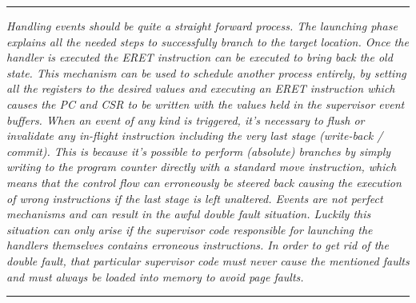     \par\noindent\rule{\textwidth}{0.4pt}
    \textit{Handling events should be quite a straight forward process. The launching phase explains all the needed steps to successfully branch to the target location. Once the handler is executed the ERET instruction can be executed to bring back the old state. This mechanism can be used to schedule another process entirely, by setting all the registers to the desired values and executing an ERET instruction which causes the PC and CSR to be written with the values held in the supervisor event buffers. When an event of any kind is triggered, it's necessary to flush or invalidate any in-flight instruction including the very last stage (write-back / commit). This is because it's possible to perform (absolute) branches by simply writing to the program counter directly with a standard move instruction, which means that the control flow can erroneously be steered back causing the execution of wrong instructions if the last stage is left unaltered. Events are not perfect mechanisms and can result in the awful double fault situation. Luckily this situation can only arise if the supervisor code responsible for launching the handlers themselves contains erroneous instructions. In order to get rid of the double fault, that particular supervisor code must never cause the mentioned faults and must always be loaded into memory to avoid page faults.}
    \par\noindent\rule{\textwidth}{0.4pt}

    \vspace{10pt}
    
    \clearpage
    
    \vspace{10pt}